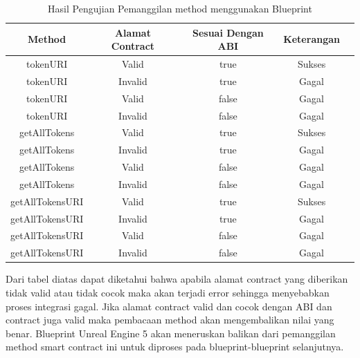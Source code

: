 \begin{longtable}{|c|c|c|c|c|}
  \caption{Hasil Pengujian Pemanggilan method menggunakan Blueprint}
  \label{tb:UjiPemanggilanMethod}                                                               \\
  \hline
  \rowcolor[HTML]{C0C0C0}
  \textbf{Method} & \textbf{Alamat Contract} & \textbf{Sesuai Dengan ABI} & \textbf{Keterangan} \\
  \hline
  tokenURI        & Valid                    & true                       & Sukses              \\
  tokenURI        & Invalid                  & true                       & Gagal               \\
  tokenURI        & Valid                    & false                      & Gagal               \\
  tokenURI        & Invalid                  & false                      & Gagal               \\
  getAllTokens    & Valid                    & true                       & Sukses              \\
  getAllTokens    & Invalid                  & true                       & Gagal               \\
  getAllTokens    & Valid                    & false                      & Gagal               \\
  getAllTokens    & Invalid                  & false                      & Gagal               \\
  getAllTokensURI & Valid                    & true                       & Sukses              \\
  getAllTokensURI & Invalid                  & true                       & Gagal               \\
  getAllTokensURI & Valid                    & false                      & Gagal               \\
  getAllTokensURI & Invalid                  & false                      & Gagal               \\
  \hline
\end{longtable}

Dari tabel diatas dapat diketahui bahwa apabila alamat contract yang diberikan tidak valid atau tidak cocok maka
akan terjadi error sehingga menyebabkan proses integrasi gagal.
Jika alamat contract valid dan cocok dengan ABI dan contract juga valid maka pembacaan method akan mengembalikan nilai yang benar.
Blueprint Unreal Engine 5 akan meneruskan balikan dari pemanggilan method smart contract ini untuk diproses pada blueprint-blueprint selanjutnya.

